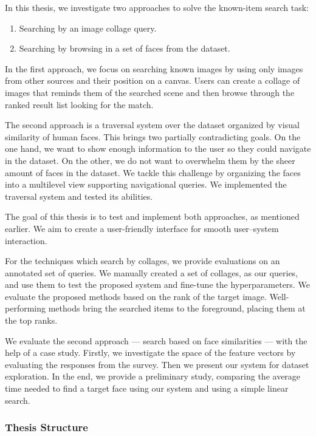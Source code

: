 In this thesis, we investigate two approaches to solve the known-item search task:

\begin{enumerate}
  \item Searching by an image collage query.
  \item Searching by browsing in a set of faces from the dataset.
\end{enumerate}

In the first approach, we focus on searching known images by using only images from other sources and their position on a canvas. Users can create a collage of images that reminds them of the searched scene and then browse through the ranked result list looking for the match.

The second approach is a traversal system over the dataset organized by visual similarity of human faces. This brings two partially contradicting goals. On the one hand, we want to show enough information to the user so they could navigate in the dataset. On the other, we do not want to overwhelm them by the sheer amount of faces in the dataset. We tackle this challenge by organizing the faces into a multilevel view supporting navigational queries. We implemented the traversal system and tested its abilities.

The goal of this thesis is to test and implement both approaches, as mentioned earlier. We aim to create a user-friendly interface for smooth user--system interaction.

For the techniques which search by collages, we provide evaluations on an annotated set of queries. We manually created a set of collages, as our queries, and use them to test the proposed system and fine-tune the hyperparameters. We evaluate the proposed methods based on the rank of the target image. Well-performing methods bring the searched items to the foreground, placing them at the top ranks.

We evaluate the second approach --- search based on face similarities --- with the help of a case study. Firstly, we investigate the space of the feature vectors by evaluating the responses from the survey. Then we present our system for dataset exploration. In the end, we provide a preliminary study, comparing the average time needed to find a target face using our system and using a simple linear search.

\subsubsection*{Thesis Structure}

